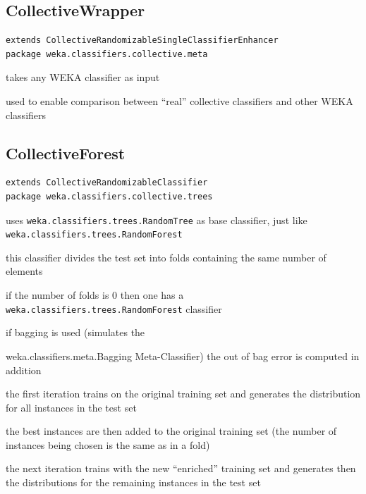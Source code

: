 \documentclass[a4paper]{book}
\begin{document}
\subsection{CollectiveWrapper}
\begin{verbatim}
extends CollectiveRandomizableSingleClassifierEnhancer
package weka.classifiers.collective.meta
\end{verbatim}

\begin{tight_itemize}
	\item takes any WEKA classifier as input
	\item used to enable comparison between ``real'' collective classifiers and 
	other WEKA classifiers
\end{tight_itemize}

\subsection{CollectiveForest}
\begin{verbatim}
extends CollectiveRandomizableClassifier
package weka.classifiers.collective.trees
\end{verbatim}

\begin{tight_itemize}
	\item uses \texttt{weka.classifiers.trees.RandomTree} as base classifier, 
	just like \texttt{weka.classifiers.trees.RandomForest}
	\item this classifier divides the test set into folds containing the same 
	number of elements
	\item if the number of folds is 0 then one has a 
	\texttt{weka.classifiers.trees.RandomForest} classifier
	\item if bagging is used (simulates the \item{weka.classifiers.meta.Bagging} 
	Meta-Classifier) the out of bag error is computed in addition
	\item the first iteration trains on the original training set and 
	generates the distribution for all instances in the test set
	\item the best instances are then added to the original training set 
	(the number of instances being chosen is the same as in a fold)
	\item the next iteration trains with the new ``enriched'' training set 
	and generates then the distributions for the remaining instances in the test set
\end{tight_itemize}
\end{document}
